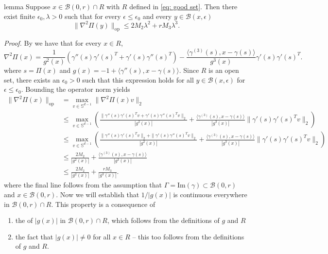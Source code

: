 \documentclass[11pt]{article}
\begin{document}
\begin{restatable}{lemma}{} \label{lemma: operator norm bound}
    Suppose $x \in \mathcal{B}(0,r) \cap R$ with $R$ defined in \cref{eq: good set}. Then there exist finite $\epsilon_0, \lambda > 0$ such that for every $\epsilon \leq \epsilon_0$ and every $y\in \mathcal{B}(x,\epsilon)$ 
    \[\|\nabla^2\Pi(y)\|_{\text{op}} \leq 2M_2\lambda^{2}+rM_3\lambda^{3}.\]
\end{restatable}

\noindent \textit{Proof.} By  we have that for every $x \in R$, 
\[\nabla^2\Pi(x) = \frac{1}{g^2(x)}\left(\gamma''(s)\gamma'(s)^T + \gamma'(s)\gamma''(s)^T\right)- \frac{\langle\gamma^{(3)}(s), x - \gamma(s)\rangle}{g^3(x)}\gamma'(s)\gamma'(s)^T.\]
where $s = \Pi(x)$ and $g(x) = -1 + \langle\gamma''(s), x-\gamma(s)\rangle$. Since $R$ is an open set, there exists an $\epsilon_0 > 0$ such that this expression holds for all $y \in \mathcal{B}(x, \epsilon)$ for $\epsilon \leq \epsilon_0$.  Bounding the operator norm yields
\begin{align*}
    \|\nabla^2\Pi(x)\|_{\text{op}} &= \max_{v\in \mathbb{S}^{d-1}} \|\nabla^2\Pi(x)v\|_2 \\
    &\leq \max_{v\in \mathbb{S}^{d-1}}\left(\frac{\|\gamma''(s)\gamma'(s)^Tv + \gamma'(s)\gamma''(s)^Tv\|_2}{|g^2(x)|} + \frac{\langle\gamma^{(3)}(s), x - \gamma(s)\rangle}{|g^3(x)|} \|\gamma'(s)\gamma'(s)^Tv\|_2\right) \\
    &\leq \max_{v\in \mathbb{S}^{d-1}}\left(\frac{\|\gamma''(s)\gamma'(s)^Tv\|_2 + \|\gamma'(s)\gamma''(s)^Tv\|_2}{|g^2(x)|} + \frac{\langle\gamma^{(3)}(s), x - \gamma(s)\rangle}{|g^3(x)|} \|\gamma'(s)\gamma'(s)^Tv\|_2\right) \\
    &\leq \frac{2M_2}{|g^2(x)|} + \frac{\langle\gamma^{(3)}(s), x - \gamma(s)\rangle}{|g^3(x)|} \\
    &\leq \frac{2M_2}{|g^2(x)|} + \frac{r M_3}{|g^3(x)|}.
\end{align*}
where the final line follows from the assumption that $\Gamma = \text{Im}(\gamma) \subset \mathcal{B}(0, r)$ and $x \in \mathcal{B}(0, r)$. Now we will establish that $1/|g(x)|$ is continuous everywhere in $\mathcal{B}(0,r) \cap R$. This property is a consequence of 
\begin{enumerate}
    \item the of $|g(x)|$ in $\mathcal{B}(0,r) \cap R$, which follows from the definitions of $g$ and $R$
    \item the fact that $|g(x)| \neq 0$ for all $x \in R$ -- this too follows from the definitions of $g$ and $R$.
\end{enumerate}
\end{document}
